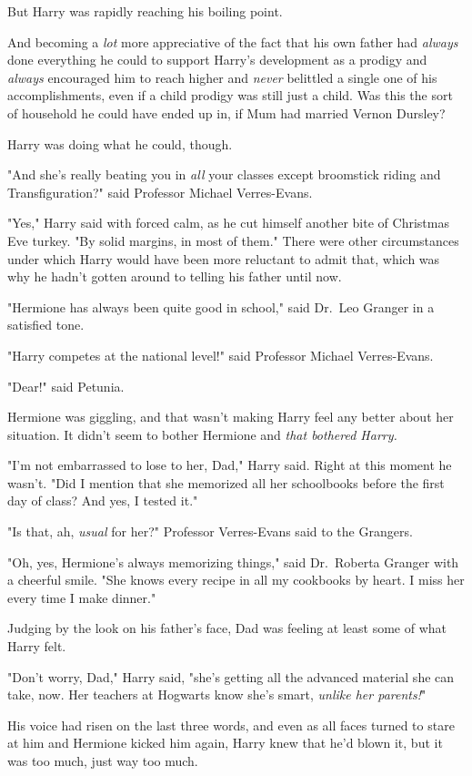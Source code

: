 But Harry was rapidly reaching his boiling point.

And becoming a \emph{lot} more appreciative of the fact that his own father had
\emph{always} done everything he could to support Harry's development as a
prodigy and \emph{always} encouraged him to reach higher and \emph{never}
belittled a single one of his accomplishments, even if a child prodigy was
still just a child. Was this the sort of household he could have ended up in,
if Mum had married Vernon Dursley?

Harry was doing what he could, though.

"And she's really beating you in \emph{all} your classes except broomstick
riding and Transfiguration?" said Professor Michael Verres-Evans.

"Yes," Harry said with forced calm, as he cut himself another bite of Christmas
Eve turkey. "By solid margins, in most of them." There were other circumstances
under which Harry would have been more reluctant to admit that, which was why
he hadn't gotten around to telling his father until now.

"Hermione has always been quite good in school," said Dr.~Leo Granger in a
satisfied tone.

"Harry competes at the national level!" said Professor Michael Verres-Evans.

"Dear!" said Petunia.

Hermione was giggling, and that wasn't making Harry feel any better about her
situation. It didn't seem to bother Hermione and \emph{that bothered Harry.}

"I'm not embarrassed to lose to her, Dad," Harry said. Right at this moment he
wasn't. "Did I mention that she memorized all her schoolbooks before the first
day of class? And yes, I tested it."

"Is that, ah, \emph{usual} for her?" Professor Verres-Evans said to the
Grangers.

"Oh, yes, Hermione's always memorizing things," said Dr.~Roberta Granger with a
cheerful smile. "She knows every recipe in all my cookbooks by heart. I miss
her every time I make dinner."

Judging by the look on his father's face, Dad was feeling at least some of what
Harry felt.

"Don't worry, Dad," Harry said, "she's getting all the advanced material she
can take, now. Her teachers at Hogwarts know she's smart, \emph{unlike her
parents!}"

His voice had risen on the last three words, and even as all faces turned to
stare at him and Hermione kicked him again, Harry knew that he'd blown it, but
it was too much, just way too much.

